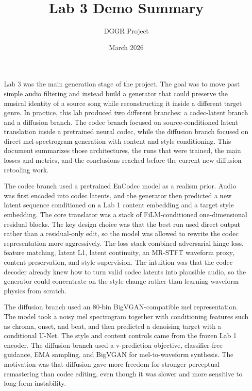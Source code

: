 \documentclass[11pt]{article}
\title{Lab 3 Demo Summary}
\author{DGGR Project}
\date{March 2026}
\begin{document}
\maketitle

Lab 3 was the main generation stage of the project. The goal was to move past simple audio filtering and instead build a generator that could preserve the musical identity of a source song while reconstructing it inside a different target genre. In practice, this lab produced two different branches: a codec-latent branch and a diffusion branch. The codec branch focused on source-conditioned latent translation inside a pretrained neural codec, while the diffusion branch focused on direct mel-spectrogram generation with content and style conditioning. This document summarizes those architectures, the runs that were trained, the main losses and metrics, and the conclusions reached before the current new diffusion retooling work.

The codec branch used a pretrained EnCodec model as a realism prior. Audio was first encoded into codec latents, and the generator then predicted a new latent sequence conditioned on a Lab 1 content embedding and a target style embedding. The core translator was a stack of FiLM-conditioned one-dimensional residual blocks. The key design choice was that the best run used direct output rather than a residual-only edit, so the model was allowed to rewrite the codec representation more aggressively. The loss stack combined adversarial hinge loss, feature matching, latent L1, latent continuity, an MR-STFT waveform proxy, content preservation, and style supervision. The intuition was that the codec decoder already knew how to turn valid codec latents into plausible audio, so the generator could concentrate on the style change rather than learning waveform physics from scratch.

The diffusion branch used an 80-bin BigVGAN-compatible mel representation. The model took a noisy mel spectrogram together with conditioning features such as chroma, onset, and beat, and then predicted a denoising target with a conditional U-Net. The style and content controls came from the frozen Lab 1 encoder. The diffusion branch used a v-prediction objective, classifier-free guidance, EMA sampling, and BigVGAN for mel-to-waveform synthesis. The motivation was that diffusion gave more freedom for stronger perceptual remastering than codec editing, even though it was slower and more sensitive to long-form instability.
\end{document}
